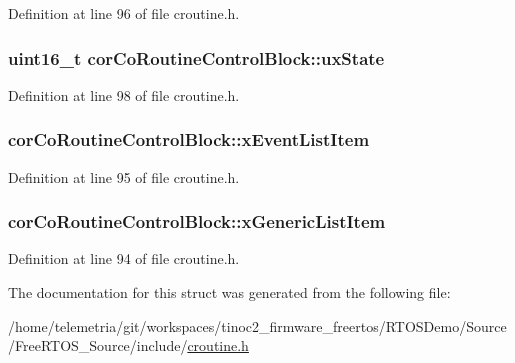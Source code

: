 Definition at line 96 of file croutine.\+h.

\subsubsection[{\texorpdfstring{ux\+State}{uxState}}]{\setlength{\rightskip}{0pt plus 5cm}uint16\+\_\+t cor\+Co\+Routine\+Control\+Block\+::ux\+State}\hypertarget{structcor_co_routine_control_block_aa0d702ff5a23c61598fe13e5a78fb1dc}{}\label{structcor_co_routine_control_block_aa0d702ff5a23c61598fe13e5a78fb1dc}


Definition at line 98 of file croutine.\+h.

\subsubsection[{\texorpdfstring{x\+Event\+List\+Item}{xEventListItem}}]{ cor\+Co\+Routine\+Control\+Block\+::x\+Event\+List\+Item}\hypertarget{structcor_co_routine_control_block_a105d316da0069f766acc3b210afed1b9}{}\label{structcor_co_routine_control_block_a105d316da0069f766acc3b210afed1b9}


Definition at line 95 of file croutine.\+h.

\subsubsection[{\texorpdfstring{x\+Generic\+List\+Item}{xGenericListItem}}]{ cor\+Co\+Routine\+Control\+Block\+::x\+Generic\+List\+Item}\hypertarget{structcor_co_routine_control_block_aa2900494db8782eeb8ef12d482501406}{}\label{structcor_co_routine_control_block_aa2900494db8782eeb8ef12d482501406}


Definition at line 94 of file croutine.\+h.



The documentation for this struct was generated from the following file\+:\begin{DoxyCompactItemize}
\item 
/home/telemetria/git/workspaces/tinoc2\+\_\+firmware\+\_\+freertos/\+R\+T\+O\+S\+Demo/\+Source/\+Free\+R\+T\+O\+S\+\_\+\+Source/include/\hyperlink{croutine_8h}{croutine.\+h}\end{DoxyCompactItemize}
